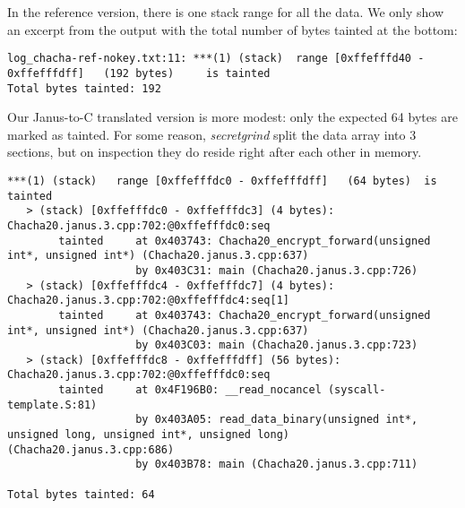 \documentclass[a4paper,10pt,openright]{memoir}
\newcommand{\term}[1]{\textit{#1}}
\begin{document}

In the reference version, there is one stack range for all the data. We 
only show an excerpt from the output with the total number of bytes 
tainted at the bottom:

\begin{verbatim}
log_chacha-ref-nokey.txt:11: ***(1) (stack)	 range [0xffefffd40 - 0xffefffdff]	 (192 bytes)	 is tainted
Total bytes tainted: 192
\end{verbatim}

Our Janus-to-C translated version is more modest: only the expected 64 
bytes are marked as tainted. For some reason, \term{secretgrind} split 
the data array into 3 sections, but on inspection they do reside right 
after each other in memory.

\begin{verbatim}
***(1) (stack)	 range [0xffefffdc0 - 0xffefffdff]	 (64 bytes)	 is tainted
   > (stack) [0xffefffdc0 - 0xffefffdc3] (4 bytes): Chacha20.janus.3.cpp:702:@0xffefffdc0:seq
        tainted     at 0x403743: Chacha20_encrypt_forward(unsigned int*, unsigned int*) (Chacha20.janus.3.cpp:637)
                    by 0x403C31: main (Chacha20.janus.3.cpp:726)
   > (stack) [0xffefffdc4 - 0xffefffdc7] (4 bytes): Chacha20.janus.3.cpp:702:@0xffefffdc4:seq[1]
        tainted     at 0x403743: Chacha20_encrypt_forward(unsigned int*, unsigned int*) (Chacha20.janus.3.cpp:637)
                    by 0x403C03: main (Chacha20.janus.3.cpp:723)
   > (stack) [0xffefffdc8 - 0xffefffdff] (56 bytes): Chacha20.janus.3.cpp:702:@0xffefffdc0:seq
        tainted     at 0x4F196B0: __read_nocancel (syscall-template.S:81)
                    by 0x403A05: read_data_binary(unsigned int*, unsigned long, unsigned int*, unsigned long) (Chacha20.janus.3.cpp:686)
                    by 0x403B78: main (Chacha20.janus.3.cpp:711)

Total bytes tainted: 64
\end{verbatim}
\end{document}
